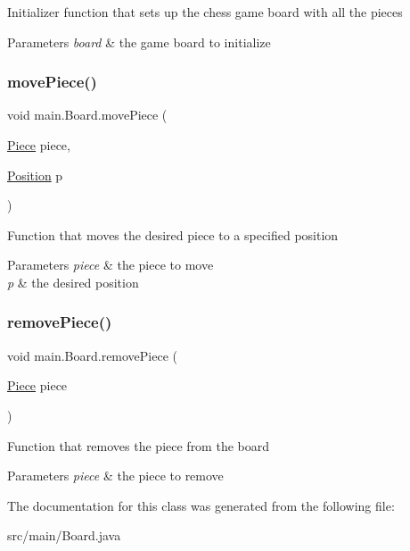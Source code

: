 Initializer function that sets up the chess game board with all the pieces 
\begin{DoxyParams}{Parameters}
{\em board} & the game board to initialize \\
\hline
\end{DoxyParams}
\mbox{\label{classmain_1_1_board_a3a4955259c7cf7ad67524f8da986d23b}} 
\subsubsection{\texorpdfstring{move\+Piece()}{movePiece()}}
{\footnotesize\ttfamily void main.\+Board.\+move\+Piece (\begin{DoxyParamCaption}\item[{\hyperlink{classmain_1_1_piece}{Piece}}]{piece,  }\item[{\hyperlink{classmain_1_1_position}{Position}}]{p }\end{DoxyParamCaption})}

Function that moves the desired piece to a specified position 
\begin{DoxyParams}{Parameters}
{\em piece} & the piece to move \\
\hline
{\em p} & the desired position \\
\hline
\end{DoxyParams}
\mbox{\label{classmain_1_1_board_abc2d60f853b5da298d709637546758f8}} 
\subsubsection{\texorpdfstring{remove\+Piece()}{removePiece()}}
{\footnotesize\ttfamily void main.\+Board.\+remove\+Piece (\begin{DoxyParamCaption}\item[{\hyperlink{classmain_1_1_piece}{Piece}}]{piece }\end{DoxyParamCaption})}

Function that removes the piece from the board 
\begin{DoxyParams}{Parameters}
{\em piece} & the piece to remove \\
\hline
\end{DoxyParams}


The documentation for this class was generated from the following file\+:\begin{DoxyCompactItemize}
\item 
src/main/Board.\+java\end{DoxyCompactItemize}
